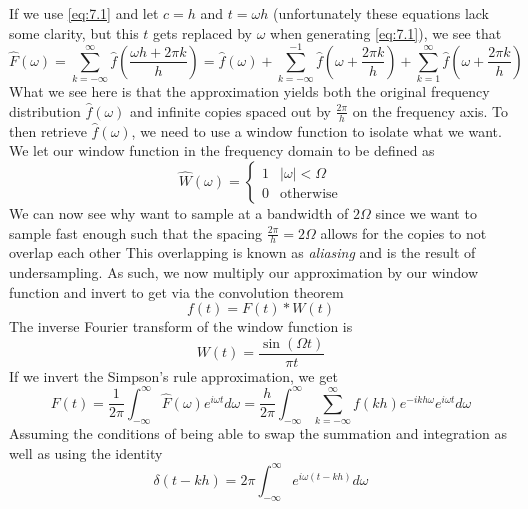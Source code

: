 \documentclass{report}
\theoremstyle{definition}
\theoremstyle{remark}
\begin{document}
If we use \eqref{eq:7.1} and let $c=h$ and $t=\omega h$ (unfortunately these equations lack some clarity, but this $t$ gets replaced by $\omega$ when generating \eqref{eq:7.1}), we see that 
\begin{equation*}
    \hat F(\omega) = \sum^\infty_{k=-\infty}\hat f\left( \frac{\omega h+2\pi k}{h }\right) = \hat f(\omega)+\sum^{-1}_{k=-\infty} \hat f\left( \omega+\frac{2\pi k}{h} \right)+\sum^{\infty}_{k=1} \hat f\left( \omega+\frac{2\pi k}{h} \right)
\end{equation*}
What we see here is that the approximation yields both the original frequency distribution $\hat f(\omega)$ and infinite copies spaced out by $\frac{2\pi}{h}$ on the frequency axis. To then retrieve $\hat f(\omega)$, we need to use a window function to isolate what we want. We let our window function in the frequency domain to be defined as 
\begin{equation*}
    \hat W(\omega) = \begin{cases}
        1 & |\omega|<\Omega \\ 0 &\text{otherwise}
    \end{cases}
\end{equation*}
We can now see why want to sample at a bandwidth of $2\Omega$ since we want to sample fast enough such that the spacing $\frac{2\pi}{h} =2\Omega$ allows for the copies to not overlap each other This overlapping is known as \textit{aliasing} and is the result of undersampling. As such, we now multiply our approximation by our window function and invert to get via the convolution theorem 
\begin{equation*}
    f(t) =F(t) *W(t)
\end{equation*}
The inverse Fourier transform of the window function is 
\begin{equation*}
    W(t) = \frac{\sin (\Omega t)}{\pi t}
\end{equation*}
If we invert the Simpson's rule approximation, we get 
\begin{equation*}
    F(t) = \frac{1}{2\pi}\int^\infty_{-\infty}\hat F(\omega)e^{i\omega t}d\omega = \frac{h}{2\pi}\int^\infty_{-\infty}\sum^\infty_{k=-\infty}f(kh)e^{-ikh\omega}e^{i\omega t}d\omega 
\end{equation*}
Assuming the conditions of being able to swap the summation and integration as well as using the identity 
\begin{equation*}
    \delta(t-kh) = 2\pi \int^\infty_{-\infty}e^{i\omega(t-kh)}d\omega
\end{equation*}
\end{document}
